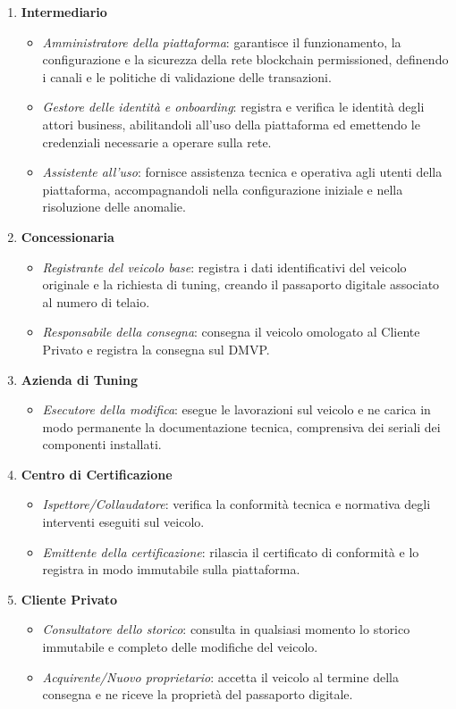 \begin{enumerate}
    \item \textbf{Intermediario}
    \begin{itemize}
        \item \textit{Amministratore della piattaforma}: garantisce il funzionamento, la configurazione e la sicurezza della rete blockchain permissioned, definendo i canali e le politiche di validazione delle transazioni.
        \item \textit{Gestore delle identità e onboarding}: registra e verifica le identità degli attori business, abilitandoli all'uso della piattaforma ed emettendo le credenziali necessarie a operare sulla rete.
        \item \textit{Assistente all'uso}: fornisce assistenza tecnica e operativa agli utenti della piattaforma, accompagnandoli nella configurazione iniziale e nella risoluzione delle anomalie.
    \end{itemize}
    \item \textbf{Concessionaria}
    \begin{itemize}
        \item \textit{Registrante del veicolo base}: registra i dati identificativi del veicolo originale e la richiesta di tuning, creando il passaporto digitale associato al numero di telaio.
        \item \textit{Responsabile della consegna}: consegna il veicolo omologato al Cliente Privato e registra la consegna sul DMVP.
    \end{itemize}
    \item \textbf{Azienda di Tuning}
    \begin{itemize}
        \item \textit{Esecutore della modifica}: esegue le lavorazioni sul veicolo e ne carica in modo permanente la documentazione tecnica, comprensiva dei seriali dei componenti installati.
    \end{itemize}
    \item \textbf{Centro di Certificazione}
    \begin{itemize}
        \item \textit{Ispettore/Collaudatore}: verifica la conformità tecnica e normativa degli interventi eseguiti sul veicolo.
        \item \textit{Emittente della certificazione}: rilascia il certificato di conformità e lo registra in modo immutabile sulla piattaforma.
    \end{itemize}
    \item \textbf{Cliente Privato}
    \begin{itemize}
        \item \textit{Consultatore dello storico}: consulta in qualsiasi momento lo storico immutabile e completo delle modifiche del veicolo.
        \item \textit{Acquirente/Nuovo proprietario}: accetta il veicolo al termine della consegna e ne riceve la proprietà del passaporto digitale.
    \end{itemize}
\end{enumerate}

